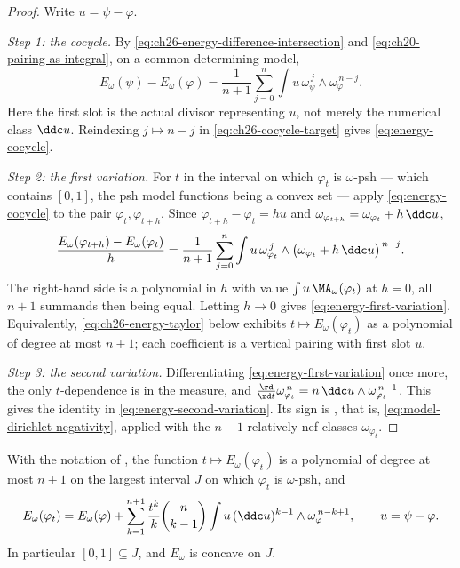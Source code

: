\begin{proof}
Write $u=\psi-\varphi$.

\emph{Step 1: the cocycle.}  By
\eqref{eq:ch26-energy-difference-intersection} and
\eqref{eq:ch20-pairing-as-integral}, on a common determining model,
\begin{equation}
\label{eq:ch26-cocycle-target}
 E_\omega(\psi)-E_\omega(\varphi)
 =\frac1{n+1}\sum_{j=0}^n\int u\,
   \omega_\psi^{\,j}\wedge\omega_\varphi^{\,n-j}.
\end{equation}
Here the first slot is the actual divisor representing $u$, not merely
the numerical class $\ddc u$.  Reindexing $j\mapsto n-j$ in
\eqref{eq:ch26-cocycle-target} gives \eqref{eq:energy-cocycle}.

\emph{Step 2: the first variation.}  For $t$ in the interval on which
$\varphi_t$ is $\omega$-psh --- which contains $[0,1]$, the psh model
functions being a convex set --- apply \eqref{eq:energy-cocycle} to the pair
$\varphi_t,\varphi_{t+h}$.  Since
$\varphi_{t+h}-\varphi_t=hu$ and
$\omega_{\varphi_{t+h}}=\omega_{\varphi_t}+h\,\ddc u$,
\[
 \frac{E_\omega(\varphi_{t+h})-E_\omega(\varphi_t)}{h}
 =\frac1{n+1}\sum_{j=0}^n\int u\,
   \omega_{\varphi_t}^{\,j}\wedge
   \bigl(\omega_{\varphi_t}+h\,\ddc u\bigr)^{\,n-j}.
\]
The right-hand side is a polynomial in $h$ with value
$\int u\,\MA_\omega(\varphi_t)$ at $h=0$, all $n+1$ summands then being
equal.  Letting $h\to0$ gives \eqref{eq:energy-first-variation}.
Equivalently, \eqref{eq:ch26-energy-taylor} below exhibits
$t\mapsto E_\omega(\varphi_t)$ as a polynomial of degree at most
$n+1$; each coefficient is a vertical pairing with first slot $u$.

\emph{Step 3: the second variation.}  Differentiating
\eqref{eq:energy-first-variation} once more, the only $t$-dependence is in
the measure, and
$\frac{\rd}{\rd t}\omega_{\varphi_t}^{\,n}=n\,\ddc u\wedge
\omega_{\varphi_t}^{\,n-1}$.  This gives the identity in
\eqref{eq:energy-second-variation}.  Its sign is
, that is,
\eqref{eq:model-dirichlet-negativity}, applied with the $n-1$ relatively nef
classes $\omega_{\varphi_t}$.
\end{proof}

\begin{corollary}
\label{cor:ch26-energy-polynomial}
With the notation of , the function
$t\mapsto E_\omega(\varphi_t)$ is a polynomial of degree at most $n+1$ on
the largest interval $J$ on which $\varphi_t$ is $\omega$-psh, and
\begin{equation}
\label{eq:ch26-energy-taylor}
 E_\omega(\varphi_t)
 =E_\omega(\varphi)
  +\sum_{k=1}^{n+1}\frac{t^{k}}{k}\binom{n}{k-1}
   \int u\,(\ddc u)^{k-1}\wedge\omega_\varphi^{\,n-k+1},
 \qquad u=\psi-\varphi .
\end{equation}
In particular $[0,1]\subseteq J$, and $E_\omega$ is concave on $J$.
\end{corollary}

